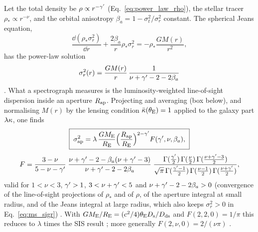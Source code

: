 Let the total density be $\rho\propto r^{-\gamma'}$ (Eq.~\ref{eq:power_law_rho}),
the stellar tracer $\rho_\ast\propto r^{-\nu}$, and the orbital anisotropy
$\beta_a=1-\sigma_t^2/\sigma_r^2$ constant.  The spherical Jeans equation,
\begin{equation}
    \frac{\dd(\rho_\ast\sigma_r^2)}{\dd r}+\frac{2\beta_a}{r}\rho_\ast\sigma_r^2
    =-\rho_\ast\frac{G M(r)}{r^2},
    \label{eq:ms_jeans}
\end{equation}
has the power-law solution
\begin{equation}
    \sigma_r^2(r)=\frac{G M(r)}{r}\,\frac{1}{\nu+\gamma'-2-2\beta_a}
    \label{eq:ms_sigr}
\end{equation}
.
What a spectrograph measures is the luminosity-weighted line-of-sight
dispersion inside an aperture $R_{\rm ap}$.  Projecting and averaging (box
below), and normalising $M(r)$ by the lensing condition $\bar{\kappa}(\theta_{\mathrm{E}})=1$
applied to the galaxy part $\lambda\kappa$, one finds
\begin{equation}
    \boxed{\;
    \sigma_{\rm ap}^2=\lambda\,\frac{G M_{\rm E}}{R_{\rm E}}
    \Bigl(\frac{R_{\rm ap}}{R_{\rm E}}\Bigr)^{2-\gamma'}F(\gamma',\nu,\beta_a),\;}
    \label{eq:ms_sigap}
\end{equation}
\begin{equation}
    F=\frac{3-\nu}{5-\nu-\gamma'}\;
      \frac{\nu+\gamma'-2-\beta_a(\nu+\gamma'-3)}{\nu+\gamma'-2-2\beta_a}\;
      \frac{\Gamma(\tfrac{\gamma'}{2})\,\Gamma(\tfrac{\nu}{2})\,\Gamma(\tfrac{\nu+\gamma'-3}{2})}
           {\sqrt\pi\,\Gamma(\tfrac{\gamma'-1}{2})\,\Gamma(\tfrac{\nu-1}{2})\,\Gamma(\tfrac{\nu+\gamma'}{2})},
    \label{eq:ms_F}
\end{equation}
valid for $1<\nu<3$, $\gamma'>1$, $3<\nu+\gamma'<5$ and $\nu+\gamma'-2-2\beta_a>0$
(convergence of the line-of-sight projections of $\rho_\ast$ and of $\rho$,
of the aperture integral at small radius, and of the Jeans integral at large
radius, which also keeps $\sigma_r^2>0$ in Eq.~\ref{eq:ms_sigr})
.  With
$GM_{\rm E}/R_{\rm E}=(c^2/4)\theta_{\mathrm{E}}D_{\mathrm{s}}/D_{\mathrm{ds}}$ and $F(2,2,0)=1/\pi$ this
reduces to $\lambda$ times the SIS result ; more generally
$F(2,\nu,0)=2/(\nu\pi)$ .

